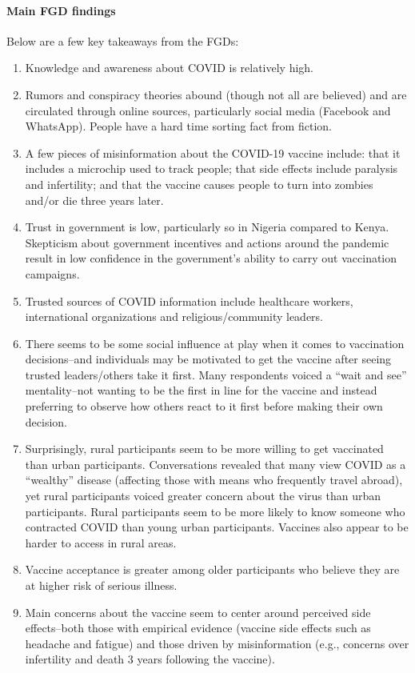 \documentclass[letterpaper, 12pt, parskip=full,DIV=10]{scrartcl}
\begin{document}
\paragraph{Main FGD findings}

Below are a few key takeaways from the FGDs:
\begin{enumerate}
\item Knowledge and awareness about COVID is relatively high.
\item Rumors and conspiracy theories abound (though not all are believed) and are circulated through online sources, particularly social media (Facebook and WhatsApp). People have a hard time sorting fact from fiction. 
\item A few pieces of misinformation about the COVID-19 vaccine include: that it includes a microchip used to track people; that side effects include paralysis and infertility; and that the vaccine causes people to turn into zombies and/or die three years later.
\item Trust in government is low, particularly so in Nigeria compared to Kenya. Skepticism about government incentives and actions around the pandemic result in low confidence in the government's ability to carry out vaccination campaigns.
\item Trusted sources of COVID information include healthcare workers, international organizations and religious/community leaders. 
\item There seems to be some social influence at play when it comes to vaccination decisions--and individuals may be motivated to get the vaccine after seeing trusted leaders/others take it first. Many respondents voiced a ``wait and see'' mentality--not wanting to be the first in line for the vaccine and instead preferring to observe how others react to it first before making their own decision.
\item Surprisingly, rural participants seem to be more willing to get vaccinated than urban participants. Conversations revealed that many view COVID as a ``wealthy'' disease (affecting those with means who frequently travel abroad), yet rural participants voiced greater concern about the virus than urban participants. Rural participants seem to be more likely to know someone who contracted COVID than young urban participants. Vaccines also appear to be harder to access in rural areas.
\item Vaccine acceptance is greater among older participants who believe they are at higher risk of serious illness.
\item Main concerns about the vaccine seem to center around perceived side effects--both those with empirical evidence (vaccine side effects such as headache and fatigue) and those driven by misinformation (e.g., concerns over infertility and death 3 years following the vaccine).
\end{enumerate}
\end{document}
